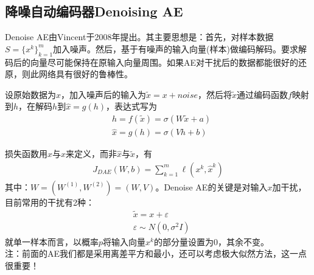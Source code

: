     \subsection{降噪自动编码器Denoising AE}
        \par
        Denoise AE由Vincent\cite{2008.Vincent}于2008年提出。其主要思想是：首先，对样本数据$S= \{x^k\}_{k=1}^m$加入噪声。然后，基于有噪声的输入向量(样本)做编码解码。要求解码后的向量尽可能保持在原输入向量周围。如果AE对干扰后的数据都能很好的还原，则此网络具有很好的鲁棒性。
        \par
        设原始数据为$x$，加入噪声后的输入为$\tilde{x}=x+noise$，然后将$\tilde{x}$通过编码函数$f$映射到$h$，在解码$h$到$\hat{x} = g(h)$，表达式写为
        \begin{align*}
        & h = f(\tilde{x}) = \sigma (W\tilde{x}+a)\\
        & \hat{x} = g(h) = \sigma (Vh+b)
        \end{align*}
        \par
        损失函数用$\hat{x}$与$x$来定义，而非$\hat{x}$与$\tilde{x}$，有
        \begin{align*}
        J_{DAE}(W,b) = \sum_{k=1}^m \ell(x^k,\hat{x}^k)
        \end{align*}
        其中：$W=(W^{(1)}, W^{(2)}) = (W,V) $。Denoise AE的关键是对输入$x$加干扰，目前常用的干扰有2种：
        \begin{align*}
        & \tilde{x} = x+\varepsilon\\
        & \varepsilon \sim N(0,\sigma^2I)
        \end{align*}
        就单一样本而言，以概率$p$将输入向量$x^k$的部分量设置为0，其余不变。\\
        注：前面的AE我们都是采用离差平方和最小，还可以考虑极大似然方法，这一点很重要！

